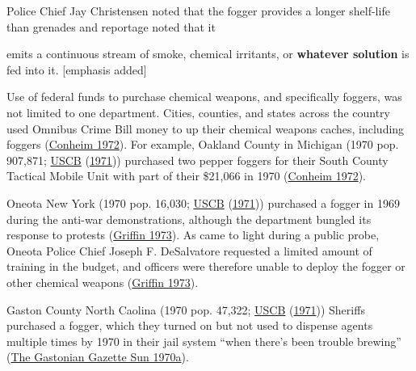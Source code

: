 \documentclass[
  11pt,
]{krantz}
\renewenvironment{quote}{\begin{VF}}{\end{VF}}
\begin{document}
Police Chief Jay Christensen noted that the fogger provides a longer shelf-life than grenades and reportage noted that it

\begin{quote}
emits a continuous stream of smoke, chemical irritants, or \textbf{whatever solution} is fed into it. {[}emphasis added{]}

\end{quote}

Use of federal funds to purchase chemical weapons, and specifically foggers, was not limited to one department.
Cities, counties, and states across the country used Omnibus Crime Bill money to up their chemical weapons caches, including foggers (\protect\hyperlink{ref-Conheim1972}{Conheim 1972}).
For example, Oakland County in Michigan (1970 pop. 907,871; \protect\hyperlink{ref-USCB1970}{USCB} (\protect\hyperlink{ref-USCB1970}{1971})) purchased two pepper foggers for their South County Tactical Mobile Unit with part of their \$21,066 in 1970 (\protect\hyperlink{ref-Conheim1972}{Conheim 1972}).

Oneota New York (1970 pop. 16,030; \protect\hyperlink{ref-USCB1970}{USCB} (\protect\hyperlink{ref-USCB1970}{1971})) purchased a fogger in 1969 during the anti-war demonstrations, although the department bungled its response to protests (\protect\hyperlink{ref-Griffin1973}{Griffin 1973}).
As came to light during a public probe, Oneota Police Chief Joseph F. DeSalvatore requested a limited amount of training in the budget, and officers were therefore unable to deploy the fogger or other chemical weapons (\protect\hyperlink{ref-Griffin1973}{Griffin 1973}).

Gaston County North Caolina (1970 pop. 47,322; \protect\hyperlink{ref-USCB1970}{USCB} (\protect\hyperlink{ref-USCB1970}{1971})) Sheriffs purchased a fogger, which they turned on but not used to dispense agents multiple times by 1970 in their jail system ``when there's been trouble brewing'' (\protect\hyperlink{ref-Balloch1970}{The Gastonian Gazette Sun 1970a}).
\end{document}
